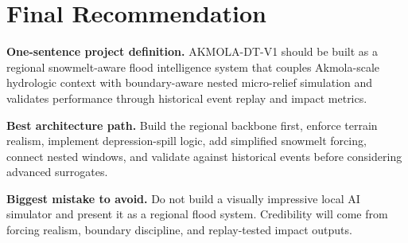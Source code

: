 \documentclass[11pt]{article}
\begin{document}
\section{Final Recommendation}

\textbf{One-sentence project definition.} AKMOLA-DT-V1 should be built as a regional snowmelt-aware flood intelligence system that couples Akmola-scale hydrologic context with boundary-aware nested micro-relief simulation and validates performance through historical event replay and impact metrics.

\textbf{Best architecture path.} Build the regional backbone first, enforce terrain realism, implement depression-spill logic, add simplified snowmelt forcing, connect nested windows, and validate against historical events before considering advanced surrogates.

\textbf{Biggest mistake to avoid.} Do not build a visually impressive local AI simulator and present it as a regional flood system. Credibility will come from forcing realism, boundary discipline, and replay-tested impact outputs.
\end{document}
